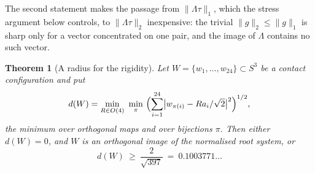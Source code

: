 \documentclass[11pt,reqno]{amsart}
\renewcommand{\_}{\origunderscore\allowbreak}
\numberwithin{equation}{section}
\theoremstyle{plain}
\newtheorem{thm}{Theorem}[section]
\theoremstyle{definition}
\theoremstyle{remark}
\begin{document}
The second statement makes the passage from $\|\Lambda\tau\|_1$, which the
stress argument below controls, to $\|\Lambda\tau\|_2$ inexpensive: the trivial
$\|g\|_2\le\|g\|_1$ is sharp only for a vector concentrated on one pair, and
the image of $\Lambda$ contains no such vector.

\begin{thm}[A radius for the rigidity]\label{thm:local-uniqueness}
Let $W=\{w_1,\dots,w_{24}\}\subset S^3$ be a contact configuration and
put
\[
  d(W)=\min_{R\in O(4)}\ \min_{\pi}\
  \Bigl(\sum_{i=1}^{24}\bigl|w_{\pi(i)}-Ra_i/\sqrt2\bigr|^2\Bigr)^{1/2},
\]
the minimum over orthogonal maps and over bijections $\pi$. Then either
$d(W)=0$, and $W$ is an orthogonal image of the normalised root system,
or
\[
  d(W)\ \ge\ \frac{2}{\sqrt{397}}\ =\ 0.1003771\ldots
\]
\end{thm}
\end{document}
